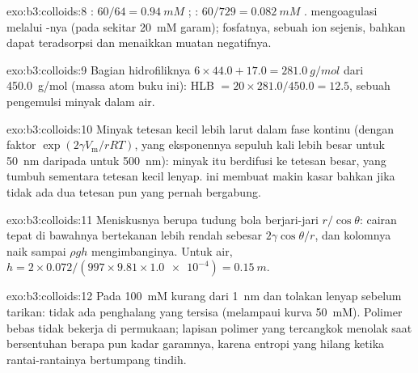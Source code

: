 \begin{solution}{exo:b3:colloids:8}
: $60/64 = \qty{0.94}{mM}$ ; : $60/729 = \qty{0.082}{mM}$ . 
mengoagulasi melalui -nya (pada sekitar \qty{20}{mM} garam); fosfatnya, sebuah
ion sejenis, bahkan dapat teradsorpsi dan menaikkan muatan negatifnya.
\end{solution}

\begin{solution}{exo:b3:colloids:9}
Bagian hidrofiliknya $6 \times 44.0 + 17.0 = \qty{281.0}{g/mol}$ dari \qty{450.0}{g/mol} (massa atom buku ini):
HLB $= 20 \times 281.0/450.0 = 12.5$, sebuah pengemulsi minyak dalam air.
\end{solution}

\begin{solution}{exo:b3:colloids:10}
Minyak tetesan kecil lebih larut dalam fase kontinu (dengan faktor
$\exp(2\gamma V_{\mathrm m}/rRT)$, yang eksponennya sepuluh kali lebih besar untuk \qty{50}{nm} daripada untuk \qty{500}{nm}):
minyak itu berdifusi ke tetesan besar, yang tumbuh sementara tetesan kecil
lenyap.  ini membuat  makin kasar bahkan jika tidak
ada dua tetesan pun yang pernah bergabung.
\end{solution}

\begin{solution}{exo:b3:colloids:11}
Meniskusnya berupa tudung bola berjari-jari $r/\cos\theta$: cairan tepat di bawahnya bertekanan
lebih rendah sebesar $2\gamma\cos\theta/r$, dan kolomnya naik sampai $\rho gh$ mengimbanginya. Untuk air,
$h = 2 \times 0.072/(997 \times 9.81 \times \num{1.0e-4}) = \qty{0.15}{m}$.
\end{solution}

\begin{solution}{exo:b3:colloids:12}
Pada \qty{100}{mM}  kurang dari \qty{1}{nm} dan tolakan lenyap sebelum
tarikan: tidak ada penghalang yang tersisa (melampaui kurva \qty{50}{mM}). Polimer bebas tidak
bekerja di permukaan; lapisan polimer yang tercangkok menolak saat bersentuhan
berapa pun kadar garamnya, karena entropi yang hilang ketika rantai-rantainya
bertumpang tindih.
\end{solution}

